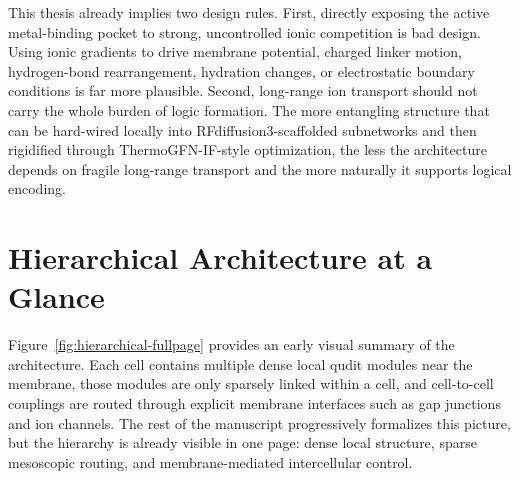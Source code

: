 \documentclass[11pt]{report}
\theoremstyle{definition}
\begin{document}
This thesis already implies two design rules. First, directly exposing the active metal-binding pocket to strong, uncontrolled ionic competition is bad design. Using ionic gradients to drive membrane potential, charged linker motion, hydrogen-bond rearrangement, hydration changes, or electrostatic boundary conditions is far more plausible. Second, long-range ion transport should not carry the whole burden of logic formation. The more entangling structure that can be hard-wired locally into RFdiffusion3-scaffolded subnetworks and then rigidified through ThermoGFN-IF-style optimization, the less the architecture depends on fragile long-range transport and the more naturally it supports logical encoding.

\section{Hierarchical Architecture at a Glance}
Figure~\ref{fig:hierarchical-fullpage} provides an early visual summary of the architecture. Each cell contains multiple dense local qudit modules near the membrane, those modules are only sparsely linked within a cell, and cell-to-cell couplings are routed through explicit membrane interfaces such as gap junctions and ion channels. The rest of the manuscript progressively formalizes this picture, but the hierarchy is already visible in one page: dense local structure, sparse mesoscopic routing, and membrane-mediated intercellular control.
\end{document}

